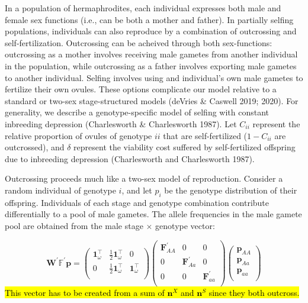 \documentclass[11pt]{article}
\def\mbf#1{\mathbf{#1}}
\def\mbb#1{\mathbb{#1}}
\begin{document}
In a population of hermaphrodites, each individual expresses both male and female sex functions (i.e., can be both a mother and father). In partially selfing populations, individuals can also reproduce by a combination of outcrossing and self-fertilization. Outcrossing can be acheived through both sex-functions: outcrossing as a mother involves receiving male gametes from another individual in the population, while outcrossing as a father involves exporting male gametes to another individual. Selfing involves using and individual's own male gametes to fertilize their own ovules. These options complicate our model relative to a standard or two-sex stage-structured models (deVries \& Caswell 2019; 2020). For generality, we describe a genotype-specific model of selfing with constant inbreeding depression (Charlesworth \& Charlesworth 1987). Let $C_{ii}$ represent the relative proportion of ovules of genotype $ii$ that are self-fertilized ($1 - C_{ii}$ are outcrossed), and $\delta$ represent the viability cost suffered by self-fertilized offspring due to inbreeding depression (Charlesworth and Charlesworth 1987).

Outcrossing proceeds much like a two-sex model of reproduction. Consider a random individual of genotype $i$, and let $p_i$ be the genotype distribution of their offspring. Individuals of each stage and genotype combination contribute differentially to a pool of male gametes. The allele frequencies in the male gamete pool are obtained from the male stage $\times$ genotype vector:

\begin{equation}
	\mbf{W}^{\prime} \mbb{F}^{\prime} \mbf{p} = 
		\left(
			\begin{array}{ccc}
				\mbf{1}^{\intercal}_{\omega} & \frac{1}{2} \mbf{1}^{\intercal}_{\omega} & 0 \\
				0 & \frac{1}{2} \mbf{1}^{\intercal}_{\omega} & \mbf{1}^{\intercal}_{\omega} \\
			\end{array} \right)
		\left(
			\begin{array}{ccc}
				\mbf{F}^{\prime}_{AA} & 0 & 0 \\
				0 & \mbf{F}^{\prime}_{Aa} & 0 \\
				0 & 0 & \mbf{F}^{\prime}_{aa} \\
			\end{array} \right)
		\left(
			\begin{array}{c}
				\mbf{p}_{AA} \\
				\mbf{p}_{Aa} \\
				\mbf{p}_{aa} \\
			\end{array} \right)
\end{equation}
\hl{This vector has to be created from a sum of $\mathbf{n}^X$ and $\mathbf{n}^S$ since they both outcross.}
\end{document}
